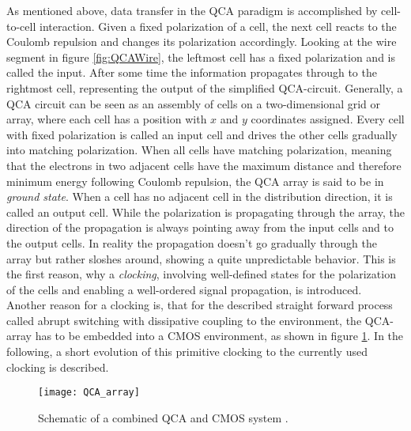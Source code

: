 As mentioned above, data transfer in the QCA paradigm is accomplished by cell-to-cell interaction. Given a fixed polarization of a cell, the next cell reacts to the Coulomb repulsion and changes its polarization accordingly. Looking at the wire segment in figure \ref{fig:QCAWire}, the leftmost cell has a fixed polarization and is called the input. After some time the information propagates through to the rightmost cell, representing the output of the simplified QCA-circuit. Generally, a QCA circuit can be seen as an assembly of cells on a two-dimensional grid or array, where each cell has a position with $x$ and $y$ coordinates assigned. Every cell with fixed polarization is called an input cell and drives the other cells gradually into matching polarization. When all cells have matching polarization, meaning that the electrons in two adjacent cells have the maximum distance and therefore minimum energy following Coulomb repulsion, the QCA array is said to be in \textit{ground state}. When a cell has no adjacent cell in the distribution direction, it is called an output cell. While the polarization is propagating through the array, the direction of the propagation is always pointing away from the input cells and to the output cells. In reality the propagation doesn't go gradually through the array but rather sloshes around, showing a quite unpredictable behavior. This is the first reason, why a \textit{clocking}, involving well-defined states for the polarization of the cells and enabling a well-ordered signal propagation, is introduced. Another reason for a clocking is, that for the described straight forward process called abrupt switching with dissipative coupling to the environment, the QCA-array has to be embedded into a CMOS environment, as shown in figure \ref{fig:QCA_array}. In the following, a short evolution of this primitive clocking to the currently used clocking is described.

\begin{figure}
	\centering
	\texttt{[image: QCA\_array]}
	\caption{Schematic of a combined QCA and CMOS system \cite{lent1994quantum}.} 
	\label{fig:QCA_array}
\end{figure}

